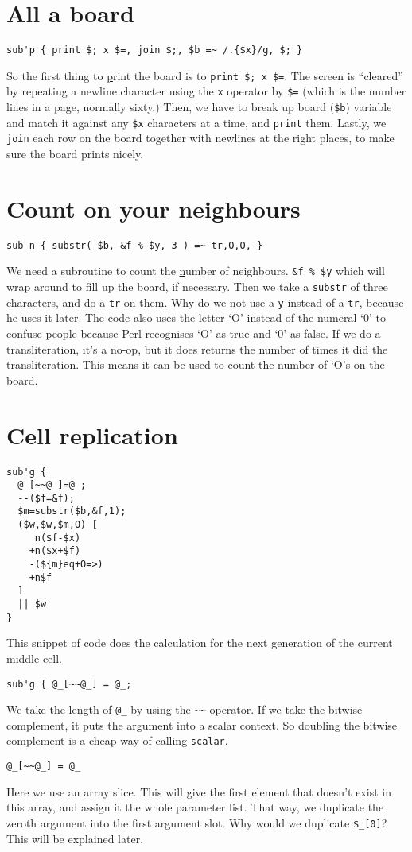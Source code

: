 \documentclass{article}
\begin{document}
\section{All a board}
\begin{verbatim}
sub'p { print $; x $=, join $;, $b =~ /.{$x}/g, $; }
\end{verbatim}
So the first thing to \underline{p}rint the board is to \mbox{\texttt{print \$; x
\$=}}.  The screen is ``cleared'' by repeating a
newline character using the \texttt{x} operator by \texttt{\$=} (which is 
the number lines in a page, normally sixty.)  Then, we have to break up
board (\texttt{\$b})
variable and match it against any \texttt{\$x} characters at a time, and
\texttt{print}
them.  Lastly, we \texttt{join} each row on the board together with 
newlines at the right places, to make sure the board prints nicely.

\section{Count on your neighbours}
\begin{verbatim}
sub n { substr( $b, &f % $y, 3 ) =~ tr,O,O, }
\end{verbatim}
We need a subroutine to count the \underline{n}umber of neighbours.  
\mbox{\texttt{\&f \% \$y}}
which will wrap around to fill up the board, if necessary.  
Then we take a \texttt{substr} of three
characters, and do a \texttt{tr} on them.  Why do we not use a
\texttt{y} instead of a
\texttt{tr}, because he uses it later.  The code also uses the letter
`O' instead of the numeral `0' to confuse people
because Perl recognises `O' as true and `0' as false.  If we do a 
transliteration, it's a no-op, but it does returns the number of times 
it did the transliteration.  This means it can be used to count the number 
of `O's on the board.

\section{Cell replication}
\begin{verbatim}
sub'g {
  @_[~~@_]=@_;
  --($f=&f);
  $m=substr($b,&f,1);
  ($w,$w,$m,O) [
     n($f-$x)
    +n($x+$f)
    -(${m}eq+O=>)
    +n$f
  ]
  || $w
}
\end{verbatim}
This snippet of code does the calculation for the next \underline{g}eneration 
of the current middle cell.

\begin{verbatim}
sub'g { @_[~~@_] = @_;
\end{verbatim}
We take the length of \texttt{@\_} by using the \texttt{\~{}\~} operator.  
If we take the bitwise complement, it puts the argument into a scalar 
context.  So doubling the bitwise complement is a cheap way of calling
\texttt{scalar}.  
\begin{verbatim}
@_[~~@_] = @_
\end{verbatim}
Here we use an array slice.  This will give the first element that
doesn't exist in this array, and assign it the whole parameter list.
That way, we duplicate the zeroth argument into the first argument slot.  Why
would we duplicate \texttt{\$\_[0]}?  This will be explained later.
\end{document}
